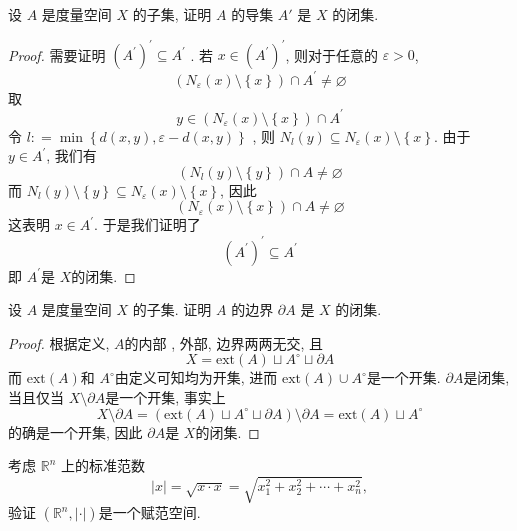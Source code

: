 \documentclass[../main.tex]{subfiles}
\begin{document}
\begin{exercise}{}{}
设 $A$ 是度量空间 $X$ 的子集, 证明 $A$ 的导集 $A'$ 是 $X$ 的闭集.
\end{exercise}
\begin{proof}
  需要证明 \(  \left( A^{\prime}  \right)^{\prime} \subseteq A^{\prime}    \) . 若 \(  x \in \left( A^{\prime}  \right)^{\prime}    \), 则对于任意的 \(   \varepsilon > 0  \), \[
 \left(  N_{ \varepsilon }\left( x \right)\setminus \left\{ x \right\} \right)\cap A^{\prime} \neq \varnothing  
  \]  取 \[
  y \in \left( N_{ \varepsilon }\left( x \right)\setminus \left\{ x \right\}  \right)\cap A^{\prime}  
  \]令 \(  l: = \min \left\{ d\left( x,y \right)  ,  \varepsilon -d\left( x,y \right) \right\}  \) , 则 \(  N_{l}\left( y \right)\subseteq N_{ \varepsilon }\left( x \right)  \setminus \left\{ x \right\}  \). 由于 \(  y \in A^{\prime}   \), 我们有 \[
  \left( N_{ l }\left( y \right)\setminus \left\{ y \right\}  \right)\cap A\neq \varnothing 
  \]  而 \(  N_{ l }\left( y \right)\setminus \left\{ y \right\} \subseteq N_{ \varepsilon }\left( x \right)\setminus \left\{ x \right\}    \), 因此  \[
  \left( N_{ \varepsilon }\left( x \right)  \setminus \left\{ x \right\} \right)\cap A \neq \varnothing
  \]这表明 \(  x\in A^{\prime}   \). 于是我们证明了 \[
  \left( A^{\prime}  \right)^{\prime} \subseteq A^{\prime}  
  \] 即 \(  A^{\prime}   \)是 \(  X  \)的闭集.  
\end{proof}
\begin{exercise}{}{}
设 $A$ 是度量空间 $X$ 的子集. 证明 $A$ 的边界 $\partial A$ 是 $X$ 的闭集.
\end{exercise}

\begin{proof}
    根据定义,  \(  A  \)的内部 , 外部, 边界两两无交, 且 \[
    X= \mathrm{ext}\left( A \right)\sqcup A^{\circ } \sqcup  \partial A 
    \]  而 \(  \mathrm{ext} \left( A \right)  \)和 \(  A^{\circ}  \)由定义可知均为开集, 进而 \(  \mathrm{ext}\left( A \right)\cup A^{\circ}   \)是一个开集. \(   \partial A  \)是闭集, 当且仅当 \(  X\setminus  \partial A  \)是一个开集, 事实上 \[
    X\setminus  \partial A= \left( \mathrm{ext}\left( A \right)\sqcup A^{\circ } \sqcup  \partial A  \right) \setminus  \partial A= \mathrm{ext}\left( A \right)\sqcup A^{\circ } 
    \]     的确是一个开集, 因此 \(   \partial A  \)是 \(  X  \)的闭集.  
\end{proof}
\begin{exercise}{}{}
   
考虑 $\mathbb{R}^n$ 上的标准范数 
\[
|x| = \sqrt{x \cdot x} = \sqrt{x_1^2 + x_2^2 + \cdots + x_n^2},
\]验证 \(  \left( \mathbb{R} ^{n},\left| \cdot  \right|  \right)   \)是一个赋范空间. 
\end{exercise}
\end{document}
